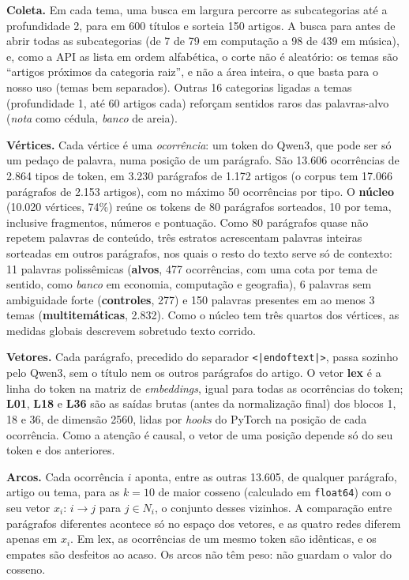\documentclass[11pt,a4paper]{article}
\begin{document}
\textbf{Coleta.} Em cada tema, uma busca em largura percorre as subcategorias até a
profundidade 2, para em 600 títulos e sorteia 150 artigos. A busca para antes de abrir todas
as subcategorias (de 7 de 79 em computação a 98 de 439 em música), e, como a API as lista em
ordem alfabética, o corte não é aleatório: os temas são ``artigos próximos da categoria
raiz'', e não a área inteira, o que basta para o nosso uso (temas bem separados). Outras 16 categorias ligadas a temas
(profundidade 1, até 60 artigos cada) reforçam sentidos raros das palavras-alvo
(\textit{nota} como cédula, \textit{banco} de areia).

\textbf{Vértices.} Cada vértice é uma \textit{ocorrência}: um token do Qwen3, que pode ser só
um pedaço de palavra, numa posição de um parágrafo. São 13.606 ocorrências de 2.864 tipos de
token, em 3.230 parágrafos de 1.172 artigos (o corpus tem 17.066 parágrafos de 2.153
artigos), com no máximo 50 ocorrências por tipo. O \textbf{núcleo} (10.020
vértices, 74\%) reúne os tokens de 80 parágrafos sorteados, 10 por tema,
inclusive fragmentos, números e pontuação. Como 80 parágrafos quase não repetem palavras de
conteúdo, três estratos acrescentam palavras inteiras sorteadas em outros parágrafos, nos
quais o resto do texto serve só de contexto: 11 palavras polissêmicas (\textbf{alvos}, 477
ocorrências, com uma cota por tema de sentido, como \textit{banco} em economia, computação e
geografia), 6 palavras sem ambiguidade forte (\textbf{controles}, 277) e 150 palavras
presentes em ao menos 3 temas (\textbf{multitemáticas}, 2.832). Como o núcleo tem três
quartos dos vértices, as medidas globais descrevem sobretudo texto corrido.

\textbf{Vetores.} Cada parágrafo, precedido do separador \texttt{<|endoftext|>}, passa
sozinho pelo Qwen3, sem o título nem os outros parágrafos do artigo. O vetor \textbf{lex} é a
linha do token na matriz de \textit{embeddings}, igual para todas as ocorrências do token;
\textbf{L01}, \textbf{L18} e \textbf{L36} são as saídas brutas (antes da normalização final)
dos blocos 1, 18 e 36, de dimensão 2560, lidas por \textit{hooks} do PyTorch na posição de
cada ocorrência. Como a atenção é causal, o vetor de uma posição depende só do seu token e
dos anteriores.

\textbf{Arcos.} Cada ocorrência $i$ aponta, entre as outras 13.605, de qualquer parágrafo,
artigo ou tema, para as $k=10$ de maior cosseno (calculado em \texttt{float64}) com o
seu vetor $x_i$: $i\to j$ para $j\in N_i$, o conjunto desses vizinhos. A comparação entre
parágrafos diferentes acontece só no espaço dos vetores, e as quatro redes diferem apenas em
$x_i$. Em lex, as ocorrências de um mesmo token são idênticas, e os empates são desfeitos ao
acaso. Os arcos não têm peso: não guardam o valor do cosseno.
\end{document}
